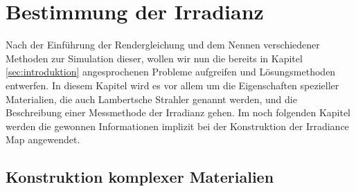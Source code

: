 \section{Bestimmung der Irradianz} %
\label{sec:bestimmung_der_irradianz}

	Nach der Einführung der Rendergleichung und dem Nennen verschiedener Methoden zur Simulation dieser, wollen wir nun die bereits in Kapitel \ref{sec:introduktion} angesprochenen Probleme aufgreifen und Lösungsmethoden entwerfen.
	In diesem Kapitel wird es vor allem um die Eigenschaften spezieller Materialien, die auch Lambertsche Strahler genannt werden, und die Beschreibung einer Messmethode der Irradianz gehen.
	Im noch folgenden Kapitel werden die gewonnen Informationen implizit bei der Konstruktion der Irradiance Map angewendet.

	\subsection{Konstruktion komplexer Materialien} %
	\label{sub:konstruktion_komplexer_materialien}

